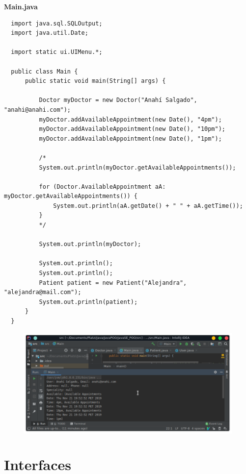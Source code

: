 \documentclass{article}
\begin{document}
\textbf{Main.java}
\begin{verbatim}
  import java.sql.SQLOutput;
  import java.util.Date;

  import static ui.UIMenu.*;

  public class Main {
      public static void main(String[] args) {

          Doctor myDoctor = new Doctor("Anahí Salgado", "anahi@anahi.com");
          myDoctor.addAvailableAppointment(new Date(), "4pm");
          myDoctor.addAvailableAppointment(new Date(), "10pm");
          myDoctor.addAvailableAppointment(new Date(), "1pm");

          /*
          System.out.println(myDoctor.getAvailableAppointments());

          for (Doctor.AvailableAppointment aA: myDoctor.getAvailableAppointments()) {
              System.out.println(aA.getDate() + " " + aA.getTime());
          }
          */

          System.out.println(myDoctor);

          System.out.println();
          System.out.println();
          Patient patient = new Patient("Alejandra", "alejandra@mail.com");
          System.out.println(patient);
      }
  }
\end{verbatim}

\newpage

\begin{figure}[h!]
  \centering
  \includegraphics[scale=0.5]{./Pictures/045_toString.png}
\end{figure}


\section{Interfaces}%
\end{document}
